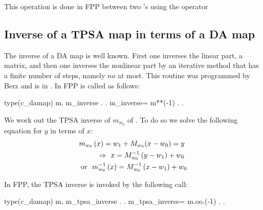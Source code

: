 \documentclass{hitec}     %
\begin{document}
{{{{This operation is done in FPP between two 's using the operator 

\subsection{Inverse of a TPSA map in terms of  a DA map }\label{s:inversetpsa}

The inverse of a DA map is well known. First one inverses the linear part, a matrix, and then one inverses the nonlinear part by an iterative method that has a finite number of steps, namely $no$ at most.  This routine was programmed by Berz and is in .  In FPP is called  as follows:

\begin{code}
type(c_damap) m, m_inverse
       .
       .
m_inverse= m**(-1)
       .
       .
\end{code}

We work out the TPSA inverse of ${m}_{{w}_{0}}$   of . To do so we solve the following equation for $y$ in terms of $x$:
%
%
\begin{align} {m}_{{w}_{0}}\left({x}\right)={w}_{1}+{M}_{{w}_{0}}(x-{w}_{0})=y~\nonumber \\
 \Rightarrow \ x=
{M}_{{w}_{0}}^{-1}\left({y-{w}_{1}}\right)+{w}_{0}~\nonumber \\
~{\rm o}{\rm r}~~{m}_{{w}_{0}}^{-1}\left({x}\right)=
{M}_{{w}_{0}}^{-1}\left({x-{w}_{1}}\right)+{w}_{0}\label{eq:tpsainv} \end{align}


In FPP, the TPSA inverse is invoked by the following call:

\begin{code}
type(c_damap) m, m_tpsa_inverse
       .
       .
m_tpsa_inverse= m.oo.(-1)
       .
       .
\end{code}



}}}}
\end{document}
